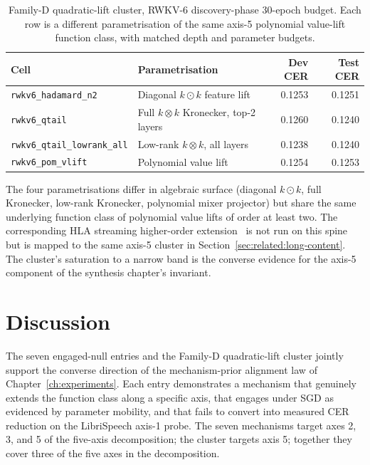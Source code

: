 \begin{table}[h]
\centering
\small
\caption[Family-D quadratic-lift cluster on RWKV-6
discovery]{Family-D quadratic-lift cluster, RWKV-6 discovery-phase
30-epoch budget. Each row is a different parametrisation of the
same axis-5 polynomial value-lift function class, with
matched depth and parameter budgets.}
\label{tab:results:family-d}
\setlength{\tabcolsep}{6pt}
\renewcommand{\arraystretch}{1.10}
\begin{tabularx}{\linewidth}{@{}X p{4.5cm} r r@{}}
\toprule
\textbf{Cell} & \textbf{Parametrisation} & \textbf{Dev CER} & \textbf{Test CER} \\
\midrule
\texttt{rwkv6\_hadamard\_n2}     & Diagonal $k \odot k$ feature lift  & 0.1253 & 0.1251 \\
\texttt{rwkv6\_qtail}            & Full $k \otimes k$ Kronecker, top-2 layers & 0.1260 & 0.1240 \\
\texttt{rwkv6\_qtail\_lowrank\_all} & Low-rank $k \otimes k$, all layers     & 0.1238 & 0.1240 \\
\texttt{rwkv6\_pom\_vlift}       & Polynomial value lift~\cite{picard2026pom} & 0.1254 & 0.1253 \\
\bottomrule
\end{tabularx}
\end{table}

The four parametrisations differ in algebraic surface (diagonal
$k \odot k$, full Kronecker, low-rank Kronecker, polynomial mixer
projector) but share the same underlying function class of
polynomial value lifts of order at least two. The corresponding
HLA streaming higher-order extension~\cite{zhang2025hla} is not run
on this spine but is mapped to the same axis-5 cluster in
Section~\ref{sec:related:long-content}. The cluster's saturation to a
narrow band is the converse evidence for the axis-5 component of the
synthesis chapter's invariant.

\section{Discussion}\label{app:engaged-null:discussion}

The seven engaged-null entries and the Family-D quadratic-lift
cluster jointly support the converse direction of the
mechanism-prior alignment law of
Chapter~\ref{ch:experiments}. Each entry demonstrates a mechanism
that genuinely extends the function class along a specific axis,
that engages under SGD as evidenced by parameter mobility, and that
fails to convert into measured CER reduction on the LibriSpeech axis-1
probe. The seven mechanisms target axes 2, 3, and 5 of the
five-axis decomposition; the cluster targets axis 5; together they
cover three of the five axes in the decomposition.

